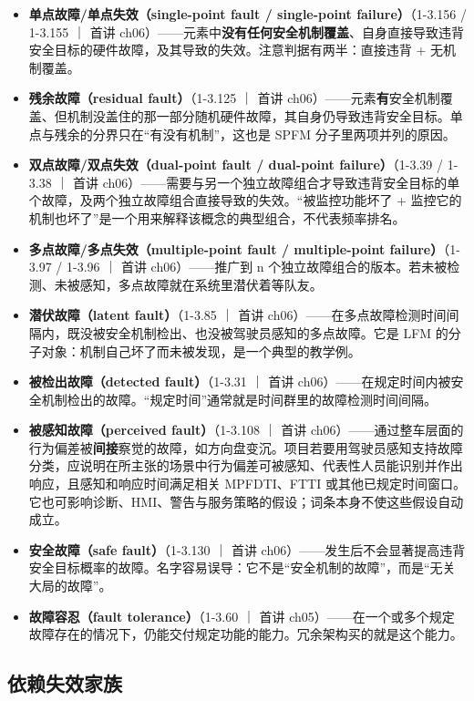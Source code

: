 \begin{itemize}
\item \textbf{单点故障/单点失效（single-point fault / single-point failure）}（1-3.156 / 1-3.155 ｜ 首讲 ch06）——元素中\textbf{没有任何安全机制覆盖}、自身直接导致违背安全目标的硬件故障，及其导致的失效。注意判据有两半：直接违背 + 无机制覆盖。
\item \textbf{残余故障（residual fault）}（1-3.125 ｜ 首讲 ch06）——元素\textbf{有}安全机制覆盖、但机制没盖住的那一部分随机硬件故障，其自身仍导致违背安全目标。单点与残余的分界只在“有没有机制”，这也是 SPFM 分子里两项并列的原因。
\item \textbf{双点故障/双点失效（dual-point fault / dual-point failure）}（1-3.39 / 1-3.38 ｜ 首讲 ch06）——需要与另一个独立故障组合才导致违背安全目标的单个故障，及两个独立故障组合直接导致的失效。“被监控功能坏了 + 监控它的机制也坏了”是一个用来解释该概念的典型组合，不代表频率排名。
\item \textbf{多点故障/多点失效（multiple-point fault / multiple-point failure）}（1-3.97 / 1-3.96 ｜ 首讲 ch06）——推广到 n 个独立故障组合的版本。若未被检测、未被感知，多点故障就在系统里潜伏着等队友。
\item \textbf{潜伏故障（latent fault）}（1-3.85 ｜ 首讲 ch06）——在多点故障检测时间间隔内，既没被安全机制检出、也没被驾驶员感知的多点故障。它是 LFM 的分子对象：机制自己坏了而未被发现，是一个典型的教学例。
\item \textbf{被检出故障（detected fault）}（1-3.31 ｜ 首讲 ch06）——在规定时间内被安全机制检出的故障。“规定时间”通常就是时间群里的故障检测时间间隔。
\item \textbf{被感知故障（perceived fault）}（1-3.108 ｜ 首讲 ch06）——通过整车层面的行为偏差被\textbf{间接}察觉的故障，如方向盘变沉。项目若要用驾驶员感知支持故障分类，应说明在所主张的场景中行为偏差可被感知、代表性人员能识别并作出响应，且感知和响应时间满足相关 MPFDTI、FTTI 或其他已规定时间窗口。它也可影响诊断、HMI、警告与服务策略的假设；词条本身不使这些假设自动成立。
\item \textbf{安全故障（safe fault）}（1-3.130 ｜ 首讲 ch06）——发生后不会显著提高违背安全目标概率的故障。名字容易误导：它不是“安全机制的故障”，而是“无关大局的故障”。
\item \textbf{故障容忍（fault tolerance）}（1-3.60 ｜ 首讲 ch05）——在一个或多个规定故障存在的情况下，仍能交付规定功能的能力。冗余架构买的就是这个能力。
\end{itemize}

\subsection{依赖失效家族}

